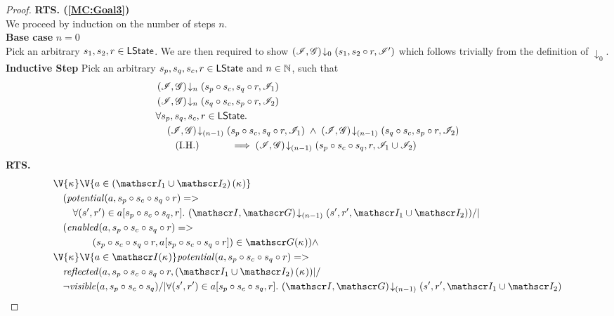 \begin{lemma}
\begin{proof}
\noindent\textbf{RTS. (\ref{MC:Goal3})} \\
We proceed by induction on the number of steps $n$.\\

\noindent\textbf{Base case }$n=0$\\
Pick an arbitrary $s_1, s_2, r \in \textsf{LState}$. We are then required to show	$\left(\mathscr{I}, \mathscr{G}\right) \!\downarrow_{0} \left(s_1, s_2 \circ r, \mathscr{I}'\right) $ which follows trivially from the definition of $\downarrow_0$.\\

\noindent\textbf{Inductive Step} Pick an arbitrary $s_p, s_q, s_c, r \in \textsf{LState}$ and $n \in \mathbb{N}$, such that
%
\begin{align}
	& \left(\mathscr{I}, \mathscr{G}\right) \!\downarrow_{n} \left(s_p \circ s_c, s_q \circ r, \mathscr{I}_{1}\right) \label{LMC:Ass1}\\
	& \left(\mathscr{I}, \mathscr{G}\right) \!\downarrow_{n} \left(s_q \circ s_c, s_p \circ r, \mathscr{I}_{2}\right) \label{LMC:Ass2}\\
	& \forall s_p, s_q, s_c, r \in \textsf{LState}.\, \nonumber \\
	&	\quad \left(\mathscr{I}, \mathscr{G}\right) \!\downarrow_{(n-1)} \left(s_p \circ s_c, s_q \circ r, \mathscr{I}_{1}\right) \;\land\; \left(\mathscr{I}, \mathscr{G}\right) \!\downarrow_{(n-1)} \left(s_q \circ s_c, s_p \circ r, \mathscr{I}_{2}\right) \nonumber \\
	&	\tag{I.H.} \qquad\quad\implies  \left(\mathscr{I}, \mathscr{G}\right) \!\downarrow_{(n-1)} \left(s_p \circ s_c \circ s_q, r, \mathscr{I}_{1} \cup \mathscr{I}_{2}\right) \label{LMC:IH}
\end{align}
%
%
\noindent\textbf{RTS.}
%
\begin{align}
	& 
	\V{\ca{}}  \V{a \in \left(\lmod_{1} \cup \lmod_{2}\right)(\ca{})} \nonumber \\
  &\quad(\m{potential}(a,s_p \composeL s_c \composeL s_q \composeL r) => \nonumber \\
  &\qquad \for{(s', r') \in a[s_p \composeL s_c \composeL s_q , r]} \extendsAMUpto{\lmod, \gmod}{(n-1)}{s'}{r'}{\lmod_{1} \cup \lmod_{2}}) /| \label{LMC:Goal1}\\
%    
  &\quad(\m{enabled}(a,s_p \composeL s_c \composeL s_q \composeL r) => \nonumber\\
  &\qquad\qquad (s_p \composeL s_c \composeL s_q  \composeL r, a[s_p \composeL s_c \composeL s_q  \composeL r])\in \gmod(\ca{})) \land\label{LMC:Goal2}\\
%  
  &\V{\ca{}}\V{a\in \lmod(\ca{})}
  \m{potential}(a,s_p \composeL s_c \composeL s_q \composeL r) =>\null \nonumber \\
  &\quad \m{reflected}(a,s_p \composeL s_c \composeL s_q \composeL r,\left(\lmod_{1} \cup \lmod_{2}\right)(\ca{})) |/\null \nonumber \\
%  
  &\quad \neg\m{visible}(a,s_p \composeL s_c \composeL s_q) /| \for{(s', r') \in a[s_p \composeL s_c \composeL s_q, r]}\extendsAMUpto{\lmod, \gmod}{(n-1)}{s'}{r'}{\lmod_{1} \cup \lmod_{2}} \label{LMC:Goal3}
\end{align}
%
%


\end{proof}
\end{lemma}

